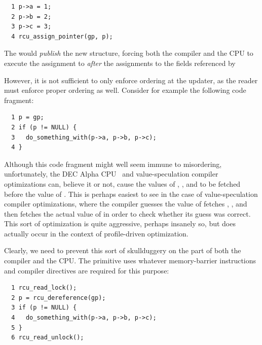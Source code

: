 \vspace{5pt}
\begin{minipage}[t]{\columnwidth}
\begin{verbatim}
  1 p->a = 1;
  2 p->b = 2;
  3 p->c = 3;
  4 rcu_assign_pointer(gp, p);
\end{verbatim}
\end{minipage}
\vspace{5pt}

The 
would \emph{publish} the new structure, forcing both the compiler
and the CPU to execute the assignment to  \emph{after}
the assignments to the fields referenced by 

However, it is not sufficient to only enforce ordering at the
updater, as the reader must enforce proper ordering as well.
Consider for example the following code fragment:

\vspace{5pt}
\begin{minipage}[t]{\columnwidth}
\begin{verbatim}
  1 p = gp;
  2 if (p != NULL) {
  3   do_something_with(p->a, p->b, p->c);
  4 }
\end{verbatim}
\end{minipage}
\vspace{5pt}

Although this code fragment might well seem immune to misordering,
unfortunately, the
DEC Alpha CPU~\cite{PaulMcKenney2005i,PaulMcKenney2005j}
and value-speculation compiler optimizations can, believe it or not,
cause the values of , , and
 to be fetched before the value of .
This is perhaps easiest to see in the case of value-speculation
compiler optimizations, where the compiler guesses the value
of  fetches , , and
 then fetches the actual value of 
in order to check whether its guess was correct.
This sort of optimization is quite aggressive, perhaps insanely so,
but does actually occur in the context of profile-driven optimization.

Clearly, we need to prevent this sort of skullduggery on the
part of both the compiler and the CPU.
The  primitive uses
whatever memory-barrier instructions and compiler
directives are required for this purpose:

\vspace{5pt}
\begin{minipage}[t]{\columnwidth}
\begin{verbatim}
  1 rcu_read_lock();
  2 p = rcu_dereference(gp);
  3 if (p != NULL) {
  4   do_something_with(p->a, p->b, p->c);
  5 }
  6 rcu_read_unlock();
\end{verbatim}
\end{minipage}
\vspace{5pt}

